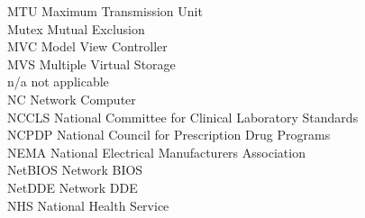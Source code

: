 \begin{tabbing}


    \>MTU \>\>Maximum Transmission Unit\\


    \>Mutex \>\>Mutual Exclusion\\

    \>MVC \>\>Model View Controller\\

    \>MVS \>\>Multiple Virtual Storage\\

    \>n/a \>\>not applicable\\




    \>NC \>\>Network Computer\\

    \>NCCLS \>\>National Committee for Clinical Laboratory Standards\\

    \>NCPDP \>\>National Council for Prescription Drug Programs\\

    \>NEMA \>\>National Electrical Manufacturers Association\\


    \>NetBIOS \>\>Network BIOS\\

    \>NetDDE \>\>Network DDE\\




    \>NHS \>\>National Health Service\\


\end{tabbing}
